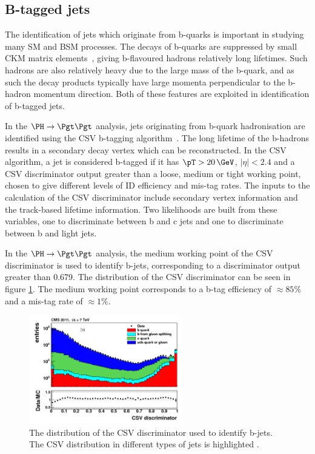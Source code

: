 \subsection{B-tagged jets}
\label{sec:btag}

The identification of jets which originate from b-quarks is important in
studying many
\ac{SM} and \ac{BSM} processes. The decays of b-quarks
are suppressed by small CKM matrix elements~\cite{PDG}, giving b-flavoured hadrons relatively
long lifetimes. Such hadrons are also relatively heavy due to the large mass of
the b-quark, and as such the decay products typically have large momenta
perpendicular to the b-hadron momentum direction. Both of these features are
exploited in identification of b-tagged jets.

In the $\PH \to \Pgt\Pgt$ analysis, jets originating from b-quark
hadronisation are identified using the \ac{CSV} b-tagging
algorithm~\cite{bjets}. The long lifetime of the b-hadrons results in a
secondary decay vertex which can be reconstructed. In the \ac{CSV} algorithm, a
jet is considered b-tagged if it has $\pT>20\,\GeV$, $|\eta|<2.4$ and a
\ac{CSV} discriminator output greater than a loose, medium or tight working
point, chosen to give different levels of ID efficiency and mis-tag rates. The
inputs to the calculation of the \ac{CSV} discriminator include secondary
vertex information and the track-based lifetime information. Two likelihoods are
built from these variables, one to discriminate between b and c jets and one to
discriminate between b and light jets. 

In the $\PH\to\Pgt\Pgt$ analysis, the medium working point of the \ac{CSV}
discriminator is used to identify b-jets, corresponding to a discriminator
output greater than 0.679. The distribution of the \ac{CSV} discriminator 
can be seen in figure \ref{fig:csv}. The medium working point corresponds to a
b-tag efficiency of $\approx 85\%$ and a mis-tag rate of $\approx 1\%$. 

\begin{figure}
\begin{center}
    \includegraphics[width=0.6\textwidth]
      {plots/reco/csv.png}
\end{center}
\caption[The distribution of the CSV discriminator used to identify b-jets.]{
The distribution of the \ac{CSV} discriminator used to identify b-jets. The
\ac{CSV} distribution in different types of jets is highlighted \cite{bjets}.     
}
\label{fig:csv}
\end{figure}


